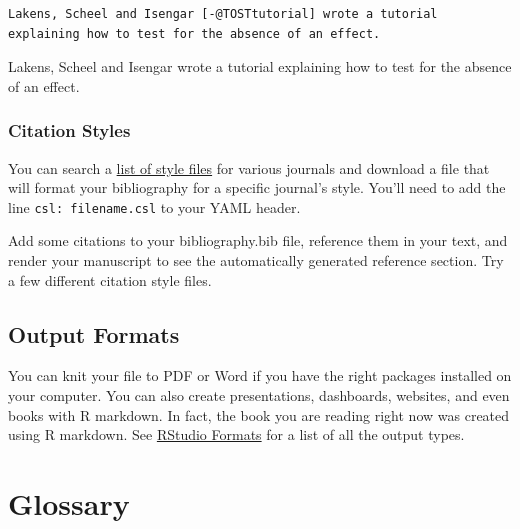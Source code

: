 \documentclass[
  oneside]{book}
\begin{document}
\begin{verbatim}
Lakens, Scheel and Isengar [-@TOSTtutorial] wrote a tutorial explaining how to test for the absence of an effect.
\end{verbatim}

Lakens, Scheel and Isengar \citeyearpar{TOSTtutorial} wrote a tutorial explaining how to test for the absence of an effect.

\hypertarget{citation-styles}{%
\subsubsection{Citation Styles}\label{citation-styles}}

You can search a \href{https://www.zotero.org/styles}{list of style files} for various journals and download a file that will format your bibliography for a specific journal's style. You'll need to add the line \texttt{csl:\ filename.csl} to your YAML header.

\begin{info}
Add some citations to your bibliography.bib file, reference them in your text, and render your manuscript to see the automatically generated reference section. Try a few different citation style files.

\end{info}

\hypertarget{output-formats}{%
\subsection{Output Formats}\label{output-formats}}

You can knit your file to PDF or Word if you have the right packages installed on your computer. You can also create presentations, dashboards, websites, and even books with R markdown. In fact, the book you are reading right now was created using R markdown. See \href{https://rmarkdown.rstudio.com/formats.html}{RStudio Formats} for a list of all the output types.

\hypertarget{glossary-repro}{%
\section{Glossary}\label{glossary-repro}}
\end{document}
